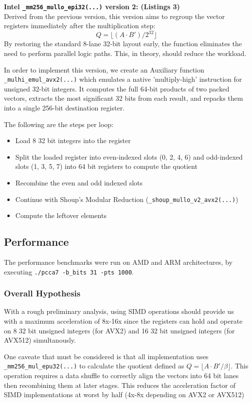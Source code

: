 \documentclass{article}
\begin{document}
\textbf{Intel \texttt{\_mm256\_mullo\_epi32(...)} version 2: (Listings 3)} \\
Derived from the previous version, this version aims to regroup the vector registers immediately after the
multiplication step:
\[Q = \lfloor (A \cdot B') / 2^{32} \rfloor\]
By restoring the standard 8-lane 32-bit layout early, the function eliminates the need to perform parallel logic paths.
This, in theory, should reduce the workload.

In order to implement this version, we create an Auxiliary function \texttt{\_mulhi\_emul\_avx2(...)} which emulates a native 'multiply-high' instruction for unsigned 32-bit integers. It computes the full 64-bit products of two packed vectors, extracts the most significant 32 bits from each result, and repacks them into a single 256-bit destination register.

The following are the steps per loop:
\begin{itemize}
    \item Load 8 32 bit integers into the register
    \item Split the loaded register into even-indexed slots (0, 2, 4, 6) and odd-indexed slots (1, 3, 5, 7) into 64 bit registers to compute the quotient
    \item Recombine the even and odd indexed slots
    \item Continue with Shoup's Modular Reduction (\texttt{\_shoup\_mullo\_v2\_avx2(...)})
    \item Compute the leftover elements
\end{itemize}


\subsection{Performance}
The performance benchmarks were run on AMD and ARM architectures, by executing \texttt{./pcca7 -b\_bits 31 -pts 1000}.
\subsubsection{Overall Hypothesis}
With a rough preliminary analysis, using SIMD operations should provide us with a maximum acceleration of 8x-16x since the registers can hold and operate on 8 32 bit unsigned integers (for AVX2) and 16 32 bit unsigned integers (for AVX512) simultanously.

One caveate that must be considered is that all implementation uses \texttt{\_mm256\_mul\_epu32(...)} to calculate the quotient defined as $Q = \lfloor A \cdot B'/\beta \rfloor$. This operation requires a data shuffle to correctly align the vectors into 64 bit lanes then recombining them at later stages. This reduces the acceleration factor of SIMD implementations at worst by half (4x-8x depending on AVX2 or AVX512)
\end{document}
